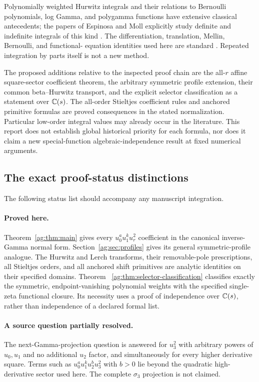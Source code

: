 Polynomially weighted Hurwitz integrals and their relations to
Bernoulli polynomials, log Gamma, and polygamma functions have extensive
classical antecedents; the papers of Espinosa and Moll explicitly
study definite and indefinite integrals of this kind \cite{EM1,EM2}.
The differentiation, translation, Mellin, Bernoulli, and functional-
equation identities used here are standard \cite{DLMFzeta,DLMFpsi,
DLMFlerch,DLMFBernoulli,DLMFintegers}. Repeated integration by parts
itself is not a new method.

The proposed additions relative to the inspected proof chain are the
all-$r$ affine square-sector coefficient theorem, the arbitrary symmetric
profile extension, their common beta--Hurwitz transport, and the
explicit selector classification as a statement over $\mathbb C(s)$. The
all-order Stieltjes coefficient rules and anchored primitive formulas
are proved consequences in the stated normalization. Particular
low-order integral values may already occur in the literature.
This report does not establish global historical priority for each
formula, nor does it claim a new special-function algebraic-independence
result at fixed numerical arguments.

\subsection{The exact proof-status distinctions}
The following status list should accompany any manuscript integration.

\paragraph{Proved here.}
Theorem~\ref{ag:thm:main} gives every
$u_0^a u_1^k u_r^2$ coefficient in the canonical inverse-Gamma normal
form. Section~\ref{ag:sec:profiles} gives its general symmetric-profile
analogue. The Hurwitz and Lerch transforms, their removable-pole
prescriptions, all Stieltjes orders, and all anchored shift primitives
are analytic identities on their specified domains. Theorem~
\ref{ag:thm:selector-classification} classifies exactly the symmetric,
endpoint-vanishing polynomial weights with the specified single-zeta
functional closure. Its necessity uses a proof of independence over
$\mathbb C(s)$, rather than independence of a declared formal list.

\paragraph{A source question partially resolved.}
The next-Gamma-projection question is answered for $u_3^2$ with arbitrary
powers of $u_0,u_1$ and no additional $u_2$ factor, and simultaneously
for every higher derivative square. Terms such as
$u_0^a u_1^k u_2^b u_3^2$ with $b>0$ lie beyond the quadratic
high-derivative sector used here. The complete $\sigma_3$ projection is
not claimed.

